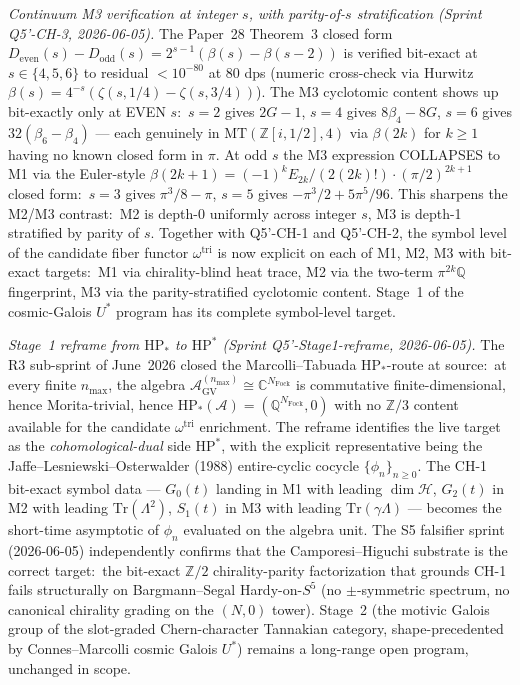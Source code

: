 \documentclass[11pt,a4paper]{article}
\theoremstyle{plain}
\theoremstyle{definition}
\newcommand{\C}{\mathbb{C}}
\newcommand{\Z}{\mathbb{Z}}
\newcommand{\Q}{\mathbb{Q}}
\begin{document}
\emph{Continuum M3 verification at integer $s$, with parity-of-$s$
stratification (Sprint Q5'-CH-3, 2026-06-05).}  The Paper~28 Theorem~3
closed form $D_{\mathrm{even}}(s) - D_{\mathrm{odd}}(s) =
2^{s-1}(\beta(s) - \beta(s-2))$ is verified bit-exact at
$s \in \{4, 5, 6\}$ to residual $< 10^{-80}$ at $80$ dps (numeric
cross-check via Hurwitz $\beta(s) = 4^{-s}(\zeta(s, 1/4) -
\zeta(s, 3/4))$).  The M3 cyclotomic content shows up bit-exactly only
at EVEN $s$:\ $s = 2$ gives $2G - 1$, $s = 4$ gives $8\beta_4 - 8G$,
$s = 6$ gives $32(\beta_6 - \beta_4)$ --- each genuinely in
$\mathrm{MT}(\Z[i, 1/2], 4)$ via $\beta(2k)$ for $k \ge 1$ having no
known closed form in $\pi$.  At odd $s$ the M3 expression COLLAPSES to
M1 via the Euler-style $\beta(2k+1) = (-1)^k E_{2k}/(2(2k)!)\cdot
(\pi/2)^{2k+1}$ closed form:\ $s = 3$ gives $\pi^3/8 - \pi$, $s = 5$
gives $-\pi^3/2 + 5\pi^5/96$.  This sharpens the M2/M3 contrast:\ M2 is
depth-0 uniformly across integer $s$, M3 is depth-1 stratified by parity
of $s$.  Together with Q5'-CH-1 and Q5'-CH-2, the symbol level of the
candidate fiber functor $\omega^{\mathrm{tri}}$ is now explicit on each
of M1, M2, M3 with bit-exact targets:\ M1 via chirality-blind heat
trace, M2 via the two-term $\pi^{2k}\Q$ fingerprint, M3 via the
parity-stratified cyclotomic content.  Stage~1 of the cosmic-Galois
$U^*$ program has its complete symbol-level target.

\emph{Stage~1 reframe from $\mathrm{HP}_*$ to $\mathrm{HP}^*$
(Sprint Q5'-Stage1-reframe, 2026-06-05).}  The R3
sub-sprint of June~2026 closed the Marcolli--Tabuada
$\mathrm{HP}_*$-route at source:\ at every finite $n_{\max}$, the
algebra $\mathcal{A}_{\mathrm{GV}}^{(n_{\max})} \cong \C^{N_{\mathrm{Fock}}}$
is commutative finite-dimensional, hence Morita-trivial, hence
$\mathrm{HP}_*(\mathcal{A}) = (\Q^{N_{\mathrm{Fock}}}, 0)$ with no $\Z/3$
content available for the candidate $\omega^{\mathrm{tri}}$
enrichment.  The reframe identifies the live target as the
\emph{cohomological-dual} side $\mathrm{HP}^*$, with the explicit
representative being the Jaffe--Lesniewski--Osterwalder (1988)
entire-cyclic cocycle $\{\phi_n\}_{n \ge 0}$.  The CH-1 bit-exact
symbol data --- $G_0(t)$ landing in M1 with leading
$\dim\mathcal{H}$, $G_2(t)$ in M2 with leading $\mathrm{Tr}(\Lambda^2)$,
$S_1(t)$ in M3 with leading $\mathrm{Tr}(\gamma\Lambda)$ --- becomes the
short-time asymptotic of $\phi_n$ evaluated on the algebra unit.  The
S5 falsifier sprint (2026-06-05) independently confirms that the Camporesi--Higuchi
substrate is the correct target:\ the bit-exact $\Z/2$
chirality-parity factorization that grounds CH-1 fails structurally
on Bargmann--Segal Hardy-on-$S^5$ (no $\pm$-symmetric spectrum, no
canonical chirality grading on the $(N, 0)$ tower).  Stage~2 (the
motivic Galois group of the slot-graded Chern-character Tannakian
category, shape-precedented by Connes--Marcolli cosmic Galois
$U^*$) remains a long-range open program, unchanged in scope.
\end{document}
